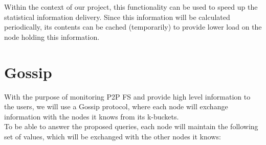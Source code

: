 \documentclass[times,9pt,article]{llncs}
\begin{document}
Within the context of our project, this functionality can be used to speed up
the statistical information delivery. Since this information will be calculated
periodically, its contents can be cached (temporarily) to provide lower load on
the node holding this information.

\section{Gossip}

With the purpose of monitoring P2P FS and provide high level information to the 
users, we will use a Gossip protocol, where each node will exchange information
with the nodes it knows from its k-buckets.\\
To be able to answer the proposed queries, each node will maintain the following
set of values, which will be exchanged with the other nodes it knows:
\end{document}
